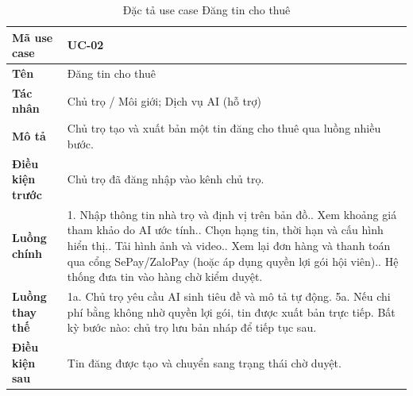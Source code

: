 \begin{table}[!ht]
\centering
\caption{Đặc tả use case Đăng tin cho thuê}
\label{tab:uc-post}
\begin{tabular}{p{} p{}}
\hline
\textbf{Mã use case} & UC-02 \\
\hline
\textbf{Tên} & Đăng tin cho thuê \\
\hline
\textbf{Tác nhân} & Chủ trọ / Môi giới; Dịch vụ AI (hỗ trợ) \\
\hline
\textbf{Mô tả} & Chủ trọ tạo và xuất bản một tin đăng cho thuê qua luồng nhiều bước. \\
\hline
\textbf{Điều kiện trước} & Chủ trọ đã đăng nhập vào kênh chủ trọ. \\
\hline
\textbf{Luồng chính} & 1. Nhập thông tin nhà trọ và định vị trên bản đồ.\newline
2. Xem khoảng giá tham khảo do AI ước tính.\newline
3. Chọn hạng tin, thời hạn và cấu hình hiển thị.\newline
4. Tải hình ảnh và video.\newline
5. Xem lại đơn hàng và thanh toán qua cổng SePay/ZaloPay (hoặc áp dụng quyền lợi gói hội viên).\newline
6. Hệ thống đưa tin vào hàng chờ kiểm duyệt. \\
\hline
\textbf{Luồng thay thế} & 1a. Chủ trọ yêu cầu AI sinh tiêu đề và mô tả tự động.\newline
5a. Nếu chi phí bằng không nhờ quyền lợi gói, tin được xuất bản trực tiếp.\newline
Bất kỳ bước nào: chủ trọ lưu bản nháp để tiếp tục sau. \\
\hline
\textbf{Điều kiện sau} & Tin đăng được tạo và chuyển sang trạng thái chờ duyệt. \\
\hline
\end{tabular}
\end{table}

